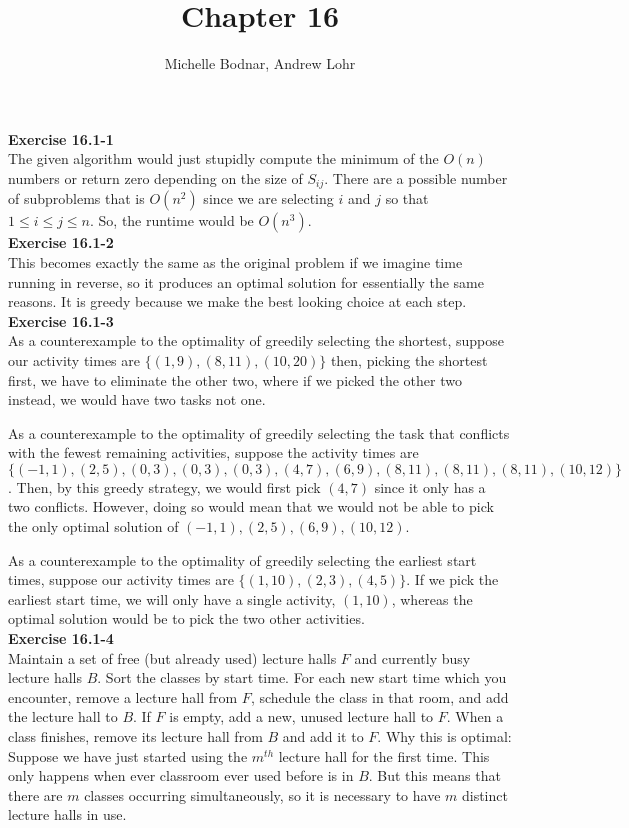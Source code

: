 \documentclass{article}
\title{Chapter 16}
\author{Michelle Bodnar, Andrew Lohr}
\begin{document}
\maketitle

\noindent\textbf{Exercise 16.1-1}\\

The given algorithm would just stupidly compute the minimum of the $O(n)$ numbers or return zero depending on the size of $S_{ij}$. There are a possible number of subproblems that is $O(n^2)$ since we are selecting $i$ and $j$ so that $1\le i \le j\le n$. So, the runtime would be $O(n^3)$. \\

\noindent\textbf{Exercise 16.1-2}\\

This becomes exactly the same as the original problem if we imagine time running in reverse, so it produces an optimal solution for essentially the same reasons.  It is greedy because we make the best looking choice at each step.\\

\noindent\textbf{Exercise 16.1-3}\\

As a counterexample to the optimality of greedily selecting the shortest, suppose our activity times are $\{(1,9),(8,11),(10,20)\}$ then, picking the shortest first, we have to eliminate the other two, where if we picked the other two instead, we would have two tasks not one.

As a counterexample to the optimality of greedily selecting the task that conflicts with the fewest remaining activities, suppose the activity times are $\{(-1,1),(2,5),(0,3),(0,3),(0,3),(4,7),(6,9),(8,11),(8,11),(8,11),(10,12)\}$. Then, by this greedy strategy, we would first pick $(4,7)$ since it only has a two conflicts. However, doing so would mean that we would not be able to pick the only optimal solution of $(-1,1),(2,5),(6,9),(10,12)$.

As a counterexample to the optimality of greedily selecting the earliest start times, suppose our activity times are $\{(1,10),(2,3),(4,5)\}$. If we pick the earliest start time, we will only have a single activity, $(1,10)$, whereas the optimal solution would be to pick the two other activities.\\

\noindent\textbf{Exercise 16.1-4}\\

Maintain a set of free (but already used) lecture halls $F$ and currently busy lecture halls $B$.  Sort the classes by start time.  For each new start time which you encounter, remove a lecture hall from $F$, schedule the class in that room, and add the lecture hall to $B$. If $F$ is empty, add a new, unused lecture hall to $F$.  When a class finishes, remove its lecture hall from $B$ and add it to $F$.  Why this is optimal:  Suppose we have just started using the $m^{th}$ lecture hall for the first time.  This only happens when ever classroom ever used before is in $B$.  But this means that there are $m$ classes occurring simultaneously, so it is necessary to have $m$ distinct lecture halls in use.  \\
\end{document}
